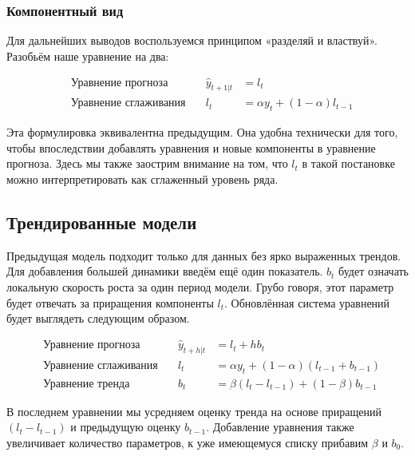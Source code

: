 \documentclass[12pt,fleqn]{article}
\begin{document}
\subsubsection{Компонентный вид}

Для дальнейших выводов воспользуемся принципом «разделяй и властвуй».
Разобьём наше уравнение на два:

\begin{equation}
  \begin{array}{llll}
    &\text{Уравнение прогноза} \quad &   \hat{y}_{t+1|t} & = l_t \\
    &\text{Уравнение сглаживания}\quad & l_t & =\alpha y_t +(1-\alpha) l_{t-1}
  \end{array}
\end{equation}

Эта формулировка эквивалентна предыдущим.
Она удобна технически для того, чтобы впоследствии добавлять уравнения и новые компоненты в уравнение прогноза.
Здесь мы также заострим внимание на том, что $l_t$ в такой постановке можно интерпретировать как сглаженный уровень ряда.

\subsection{Трендированные модели}

Предыдущая модель подходит только для данных без ярко выраженных трендов.
Для добавления большей динамики введём ещё один показатель.
$b_t$ будет означать локальную скорость роста за один период модели.
Грубо говоря, этот параметр будет отвечать за приращения компоненты $l_t$.
Обновлённая система уравнений будет выглядеть следующим образом.

\begin{equation}
  \begin{array}{llll}
    &\text{Уравнение прогноза} \quad &   \hat{y}_{t+h|t} & = l_t + h b_t \\
    &\text{Уравнение сглаживания}\quad & l_t & =\alpha y_t +(1-\alpha)(l_{t-1} + b_{t-1}) \\
    &\text{Уравнение тренда}\quad & b_t & =\beta (l_t - l_{t-1}) +(1-\beta) b_{t-1}
  \end{array}
\end{equation}

В последнем уравнении мы усредняем оценку тренда на основе приращений $(l_t - l_{t-1})$ и предыдущую оценку $b_{t-1}$.
Добавление уравнения также увеличивает количество параметров, к уже имеющемуся списку прибавим $\beta$ и $b_0$.
\end{document}
